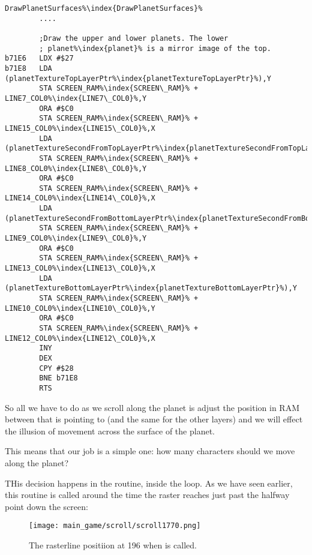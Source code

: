 \begin{lstlisting}[escapechar=\%]
DrawPlanetSurfaces%\index{DrawPlanetSurfaces}%
        ....

        ;Draw the upper and lower planets. The lower
        ; planet%\index{planet}% is a mirror image of the top.
b71E6   LDX #$27
b71E8   LDA (planetTextureTopLayerPtr%\index{planetTextureTopLayerPtr}%),Y
        STA SCREEN_RAM%\index{SCREEN\_RAM}% + LINE7_COL0%\index{LINE7\_COL0}%,Y
        ORA #$C0
        STA SCREEN_RAM%\index{SCREEN\_RAM}% + LINE15_COL0%\index{LINE15\_COL0}%,X
        LDA (planetTextureSecondFromTopLayerPtr%\index{planetTextureSecondFromTopLayerPtr}%),Y
        STA SCREEN_RAM%\index{SCREEN\_RAM}% + LINE8_COL0%\index{LINE8\_COL0}%,Y
        ORA #$C0
        STA SCREEN_RAM%\index{SCREEN\_RAM}% + LINE14_COL0%\index{LINE14\_COL0}%,X
        LDA (planetTextureSecondFromBottomLayerPtr%\index{planetTextureSecondFromBottomLayerPtr}%),Y
        STA SCREEN_RAM%\index{SCREEN\_RAM}% + LINE9_COL0%\index{LINE9\_COL0}%,Y
        ORA #$C0
        STA SCREEN_RAM%\index{SCREEN\_RAM}% + LINE13_COL0%\index{LINE13\_COL0}%,X
        LDA (planetTextureBottomLayerPtr%\index{planetTextureBottomLayerPtr}%),Y
        STA SCREEN_RAM%\index{SCREEN\_RAM}% + LINE10_COL0%\index{LINE10\_COL0}%,Y
        ORA #$C0
        STA SCREEN_RAM%\index{SCREEN\_RAM}% + LINE12_COL0%\index{LINE12\_COL0}%,X
        INY
        DEX
        CPY #$28
        BNE b71E8
        RTS
\end{lstlisting}

So all we have to do as we scroll along the planet is adjust the position in RAM between 
that   is pointing to (and the same for the other layers) and we will effect
the illusion of movement across the surface of the planet.

This means that our job is a simple one: how many characters should we move along the planet?

THis decision happens in the  routine, inside the  loop. As
we have seen earlier, this routine is called around the time the raster reaches just past the halfway point
down the screen:

\begin{figure}[H]
    \centering
      \texttt{[image: main\_game/scroll/scroll1770.png]}%
\caption{The rasterline positiion at 196 when  is called.}
\end{figure}

